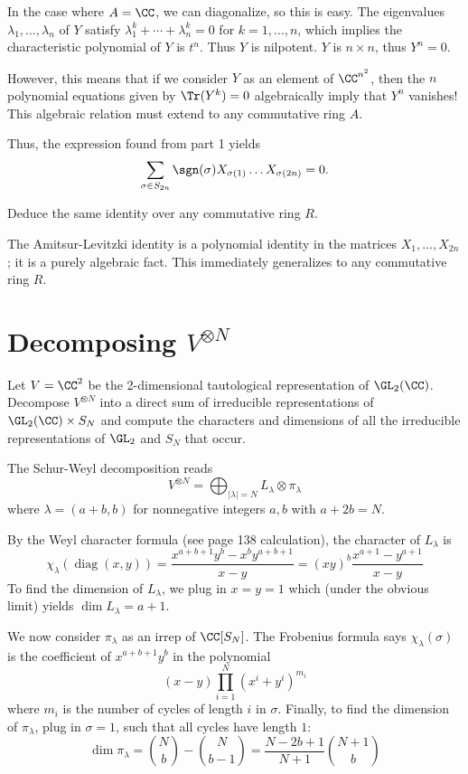 \documentclass[11pt, headheight=30pt]{scrartcl}
\DeclareMathOperator{\diag}{diag}
\begin{document}
In the case where $A = \CC$, we can diagonalize, so this is easy. The eigenvalues $\lambda_1, \dots, \lambda_n$ of $Y$ satisfy $\lambda_1^k + \cdots + \lambda_n^k = 0$ for $k = 1, \dots, n$, which implies the characteristic polynomial of $Y$ is $t^n$. Thus $Y$ is nilpotent. $Y$ is $n \times n$, thus $Y^n = 0$.

However, this means that if we consider $Y$ as an element of $\CC^{n^2}$, then the $n$ polynomial equations given by $\Tr(Y^k)=0$ algebraically imply that $Y^n$ vanishes! This algebraic relation must extend to any commutative ring $A$.

Thus, the expression found from part 1 yields
\[
    \sum_{\sigma \in S_{2n}} \sgn(\sigma) X_{\sigma(1)} \dots X_{\sigma(2n)} = 0.
\]

\begin{prob}
    Deduce the same identity over any commutative ring $R$.
\end{prob}

The Amitsur-Levitzki identity is a polynomial identity in the matrices $X_1, \dots, X_{2n}$; it is a purely algebraic fact. This immediately generalizes to any commutative ring $R$.


\section{Decomposing $V^{\otimes N}$}
\setcounter{prob*}{3}

\begin{prob*}
    Let $V = \CC^2$ be the 2-dimensional tautological representation of $\GL_2(\CC)$. Decompose $V^{\otimes N}$ into a direct sum of irreducible representations of $\GL_2(\CC) \times S_N$ and compute the characters and dimensions of all the irreducible representations of $\GL_2$ and $S_N$ that occur.
\end{prob*}

The Schur-Weyl decomposition reads
\[
    V^{\otimes N} = \bigoplus_{|\lambda|=N} L_\lambda \otimes \pi_\lambda
\]
where $\lambda = (a+b,b)$ for nonnegative integers $a,b$ with $a+2b=N$.

By the Weyl character formula (see page 138 calculation), the character of $L_\lambda$ is
\[
    \chi_\lambda(\diag(x,y)) = \frac{x^{a+b+1}y^{b} - x^{b}y^{a+b+1}}{x-y} = (xy)^{b} \frac{x^{a+1}-y^{a+1}}{x-y}
\]
To find the dimension of $L_\lambda$, we plug in $x=y=1$ which (under the obvious limit) yields $\dim L_\lambda = a+1$.

We now consider $\pi_\lambda$ as an irrep of $\CC[S_N]$. The Frobenius formula says $\chi_\lambda(\sigma)$ is the coefficient of $x^{a+b+1} y^b$ in the polynomial
\[
    (x-y) \prod_{i=1}^N (x^i + y^i)^{m_i}
\]
where $m_i$ is the number of cycles of length $i$ in $\sigma$. Finally, to find the dimension of $\pi_\lambda$, plug in $\sigma = 1$, such that all cycles have length $1$:
\[
    \dim \pi_\lambda = \binom{N}{b} - \binom{N}{b-1} = \frac{N-2b+1}{N+1} \binom{N+1}{b}
\]
\end{document}
